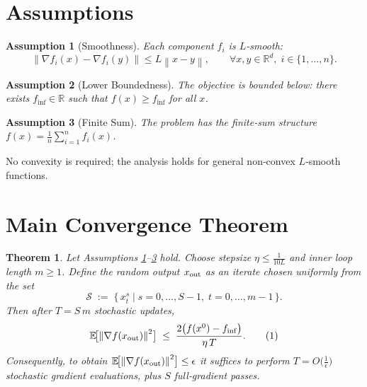 \documentclass[11pt]{article}
\newtheorem{theorem}{Theorem}
\newtheorem{assumption}{Assumption}
\newcommand{\E}{\mathbb{E}}
\newcommand{\R}{\mathbb{R}}
\newcommand{\norm}[1]{\left\|#1\right\|}
\begin{document}
\section*{Assumptions}
\begin{assumption}[Smoothness]\label{ass:smooth}
Each component $f_i$ is $L$‑smooth:
\[
\norm{\nabla f_i(x)-\nabla f_i(y)}\le L\norm{x-y},
\qquad\forall x,y\in\R^{d},\; i\in\{1,\dots,n\}.
\]
\end{assumption}
\begin{assumption}[Lower Boundedness]\label{ass:lb}
The objective is bounded below: there exists $f_{\inf}\in\R$ such that $f(x)\ge f_{\inf}$ for all $x$.
\end{assumption}
\begin{assumption}[Finite Sum]\label{ass:finite}
The problem has the finite‑sum structure $f(x)=\frac1n\sum_{i=1}^{n}f_i(x)$.
\end{assumption}
No convexity is required; the analysis holds for general non‑convex $L$‑smooth functions.

\section*{Main Convergence Theorem}
\begin{theorem}\label{thm:svrg-nonconvex}
Let Assumptions \ref{ass:smooth}–\ref{ass:finite} hold.
Choose stepsize $\displaystyle\eta\le\frac{1}{10L}$ and inner loop length $m\ge 1$.
Define the random output $x_{\rm out}$ as an iterate chosen uniformly from the set
\[
\mathcal{S}\;:=\;\bigl\{\,x^{s}_{t}\mid s=0,\dots,S-1,\; t=0,\dots,m-1\,\bigr\}.
\]
Then after $T=S\,m$ stochastic updates,
\[
\E\!\bigl[\norm{\nabla f(x_{\rm out})}^{2}\bigr]
\;\le\;
\frac{2\bigl(f(x^{0})-f_{\inf}\bigr)}{\eta\,T}.
\tag{1}
\]
Consequently, to obtain $\E\!\bigl[\norm{\nabla f(x_{\rm out})}^{2}\bigr]\le\epsilon$ it suffices to perform
$T=O\!\bigl(\tfrac{1}{\epsilon}\bigr)$ stochastic gradient evaluations, plus $S$ full‑gradient passes.
\end{theorem}

\end{document}
